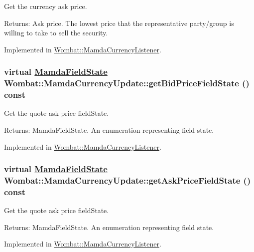Get the currency ask price. 

\begin{Desc}
\item[Returns:]Ask price. The lowest price that the representative party/group is willing to take to sell the security. \end{Desc}


Implemented in \hyperlink{classWombat_1_1MamdaCurrencyListener_7e0b54e9607f5e4770ab22d2da0c63fe}{Wombat::Mamda\-Currency\-Listener}.\hypertarget{classWombat_1_1MamdaCurrencyUpdate_cb8f38e834099963b5bee3d771b6573a}{
\subsubsection[getBidPriceFieldState]{\setlength{\rightskip}{0pt plus 5cm}virtual \hyperlink{namespaceWombat_93aac974f2ab713554fd12a1fa3b7d2a}{Mamda\-Field\-State} Wombat::Mamda\-Currency\-Update::get\-Bid\-Price\-Field\-State () const}}
\label{classWombat_1_1MamdaCurrencyUpdate_cb8f38e834099963b5bee3d771b6573a}


Get the quote ask price field\-State. 

\begin{Desc}
\item[Returns:]Mamda\-Field\-State. An enumeration representing field state. \end{Desc}


Implemented in \hyperlink{classWombat_1_1MamdaCurrencyListener_5db8b40b06fe6b4fb3fa1e388502a8c2}{Wombat::Mamda\-Currency\-Listener}.\hypertarget{classWombat_1_1MamdaCurrencyUpdate_43b7f8357bf87770254d215bd949d2b5}{
\subsubsection[getAskPriceFieldState]{\setlength{\rightskip}{0pt plus 5cm}virtual \hyperlink{namespaceWombat_93aac974f2ab713554fd12a1fa3b7d2a}{Mamda\-Field\-State} Wombat::Mamda\-Currency\-Update::get\-Ask\-Price\-Field\-State () const}}
\label{classWombat_1_1MamdaCurrencyUpdate_43b7f8357bf87770254d215bd949d2b5}


Get the quote ask price field\-State. 

\begin{Desc}
\item[Returns:]Mamda\-Field\-State. An enumeration representing field state. \end{Desc}


Implemented in \hyperlink{classWombat_1_1MamdaCurrencyListener_485502d95a2b9f71119353b736719d57}{Wombat::Mamda\-Currency\-Listener}.
